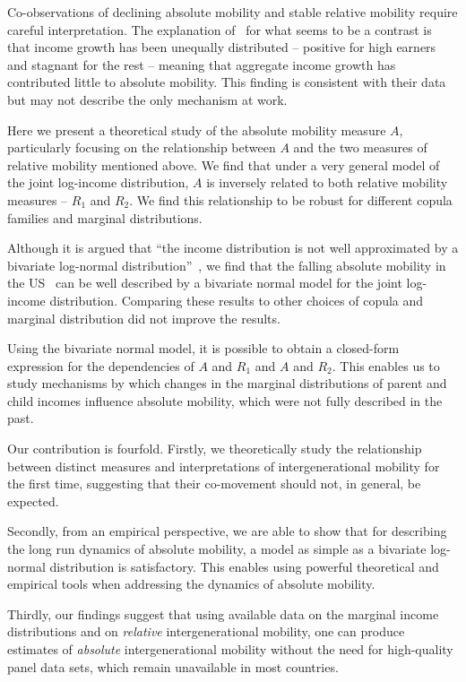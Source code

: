 \documentclass[12pt]{article}
\numberwithin{equation}{section}
\begin{document}
Co-observations of declining absolute mobility and stable relative mobility require careful interpretation. The explanation of~\citet{chetty2017fading} for what seems to be a contrast is that income growth has been unequally distributed -- positive for high earners and stagnant for the rest -- meaning that aggregate income growth has contributed little to absolute mobility. This finding is consistent with their data but may not describe the only mechanism at work.

Here we present a theoretical study of the absolute mobility measure $A$, particularly focusing on the relationship between $A$ and the two measures of relative mobility mentioned above. We find that under a very general model of the joint log-income distribution, $A$ is inversely related to both relative mobility measures -- $R_1$ and $R_2$. We find this relationship to be robust for different copula families and marginal distributions.

Although it is argued that ``the income distribution is not well approximated by a bivariate log-normal distribution''~\citep[p.~1574]{chetty2014land}, we find that the falling absolute mobility in the US~\citep{chetty2017fading} can be well described by a bivariate normal model for the joint log-income distribution. Comparing these results to other choices of copula and marginal distribution did not improve the results.

Using the bivariate normal model, it is possible to obtain a closed-form expression for the dependencies of $A$ and $R_1$ and $A$ and $R_2$. This enables us to study mechanisms by which changes in the marginal distributions of parent and child incomes influence absolute mobility, which were not fully described in the past.

Our contribution is fourfold. Firstly, we theoretically study the relationship between distinct measures and interpretations of intergenerational mobility for the first time, suggesting that their co-movement should not, in general, be expected.

Secondly, from an empirical perspective, we are able to show that for describing the long run dynamics of absolute mobility, a model as simple as a bivariate log-normal distribution is satisfactory. This enables using powerful theoretical and empirical tools when addressing the dynamics of absolute mobility.

Thirdly, our findings suggest that using available data on the marginal income distributions and on \textit{relative} intergenerational mobility, one can produce estimates of \textit{absolute} intergenerational mobility without the need for high-quality panel data sets, which remain unavailable in most countries.
\end{document}
